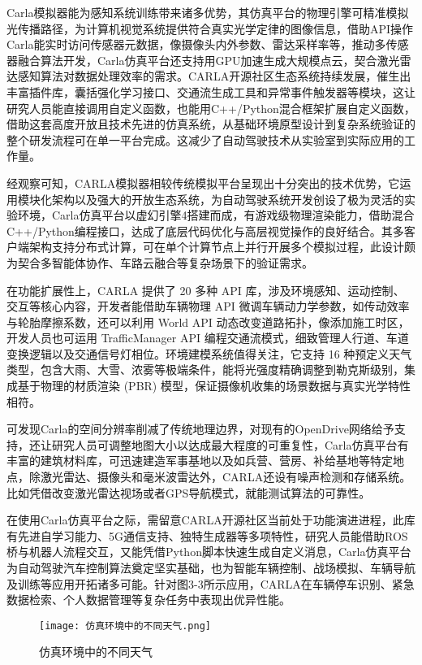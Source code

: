 Carla模拟器能为感知系统训练带来诸多优势，其仿真平台的物理引擎可精准模拟光传播路径，为计算机视觉系统提供符合真实光学定律的图像信息，借助API操作Carla能实时访问传感器元数据，像摄像头内外参数、雷达采样率等，推动多传感器融合算法开发，Carla仿真平台还支持用GPU加速生成大规模点云，契合激光雷达感知算法对数据处理效率的需求。CARLA开源社区生态系统持续发展，催生出丰富插件库，囊括强化学习接口、交通流生成工具和异常事件触发器等模块，这让研究人员能直接调用自定义函数，也能用C++/Python混合框架扩展自定义函数，借助这套高度开放且技术先进的仿真系统，从基础环境原型设计到复杂系统验证的整个研发流程可在单一平台完成。这减少了自动驾驶技术从实验室到实际应用的工作量。

经观察可知，CARLA模拟器相较传统模拟平台呈现出十分突出的技术优势，它运用模块化架构以及强大的开放生态系统，为自动驾驶系统开发创设了极为灵活的实验环境，Carla仿真平台以虚幻引擎4搭建而成，有游戏级物理渲染能力，借助混合C++/Python编程接口，达成了底层代码优化与高层视觉操作的良好结合。其多客户端架构支持分布式计算，可在单个计算节点上并行开展多个模拟过程，此设计颇为契合多智能体协作、车路云融合等复杂场景下的验证需求。

在功能扩展性上，CARLA 提供了 20 多种 API 库，涉及环境感知、运动控制、交互等核心内容，开发者能借助车辆物理 API 微调车辆动力学参数，如传动效率与轮胎摩擦系数，还可以利用 World API 动态改变道路拓扑，像添加施工时区，开发人员也可运用 TrafficManager API 编程交通流模式，细致管理人行道、车道变换逻辑以及交通信号灯相位。环境建模系统值得关注，它支持 16 种预定义天气类型，包含大雨、大雪、浓雾等极端条件，能将光强度精确调整到勒克斯级别，集成基于物理的材质渲染 (PBR) 模型，保证摄像机收集的场景数据与真实光学特性相符。

可发现Carla的空间分辨率削减了传统地理边界，对现有的OpenDrive网络给予支持，还让研究人员可调整地图大小以达成最大程度的可重复性，Carla仿真平台有丰富的建筑材料库，可迅速建造军事基地以及如兵营、营房、补给基地等特定地点，除激光雷达、摄像头和毫米波雷达外，CARLA还设有噪声检测和存储系统。比如凭借改变激光雷达视场或者GPS导航模式，就能测试算法的可靠性。

在使用Carla仿真平台之际，需留意CARLA开源社区当前处于功能演进进程，此库有先进自学习能力、5G通信支持、独特生成器等多项特性，研究人员能借助ROS桥与机器人流程交互，又能凭借Python脚本快速生成自定义消息，Carla仿真平台为自动驾驶汽车控制算法奠定坚实基础，也为智能车辆控制、战场模拟、车辆导航及训练等应用开拓诸多可能。针对图3-3所示应用，CARLA在车辆停车识别、紧急数据检索、个人数据管理等复杂任务中表现出优异性能。

\begin{figure}[hbt]
	\centering
	\texttt{[image: 仿真环境中的不同天气.png]}
	\caption{仿真环境中的不同天气}
	\label{f.example}
\end{figure}

